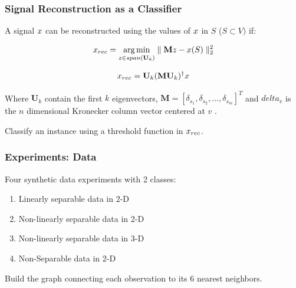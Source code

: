 \documentclass[11pts]{beamer}
\DeclareMathOperator*{\argmin}{arg\,min}
\DeclareMathOperator*{\argmin}{arg\,min}
\begin{document}

\begin{frame}%
\frametitle{Signal Reconstruction as a Classifier}

A signal $\mathnormal{x}$ can be reconstructed using the values of $\mathnormal{x}$ in $S$ ($S \subset V)$ if:

\begin{equation*}
    \mathnormal{x}_{rec}=\argmin_{z\in span(\mathbf{U}_{k})}\parallel \mathbf{M}z-\mathnormal{x}(S)\parallel_{2}^{2}
\end{equation*}

\begin{equation*}
    \mathnormal{x}_{rec}=\mathbf{U}_{k}(\mathbf{MU}_{k})^{\dagger}\mathnormal{x}
\end{equation*}

Where $\mathbf{U}_{k}$ contain the first $k$ eigenvectors, $\mathbf{M}=[\delta_{s_1},\delta_{s_2},...,\delta_{s_m}]^{T}$ and $delta_{v}$ is the $n$ dimensional Kronecker column vector centered at $v$ .


Classify an instance using a threshold function  in $\mathnormal{x}_{rec}$.
\end{frame}







\begin{frame}%
\frametitle{Experiments: Data}
Four synthetic data experiments with 2 classes:
\begin{enumerate} 
    \item Linearly separable data in 2-D
    \item Non-linearly separable data in 2-D
    \item Non-linearly separable data in 3-D
    \item Non-Separable data in 2-D
\end{enumerate}

Build the graph connecting each observation to its 6 nearest neighbors.
\end{frame}
\end{document}
